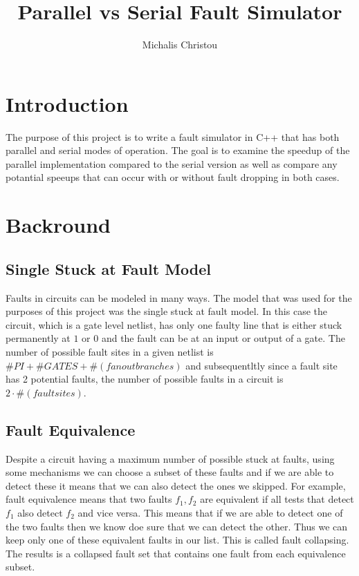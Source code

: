 \documentclass[a4paper,12pt]{article}
\author{Michalis Christou}
\title{Parallel vs Serial Fault Simulator}
\begin{document}
\maketitle

\section*{Introduction}
The purpose of this project is to write a fault simulator in C++ that has both parallel and serial modes of operation. The goal is to examine the speedup of the parallel implementation compared to the serial version as well as compare any potantial speeups that can occur with or without fault dropping in both cases.


\section*{Backround}
\subsection*{Single Stuck at Fault Model}
Faults in circuits can be modeled in many ways. The model that was used for the purposes of this project was the single stuck at fault model. In this case the circuit, which is a gate level netlist, has only one faulty line that is either stuck permanently at $1$ or $0$ and the fault can be at an input or output of a gate. The number of possible fault sites in a given netlist is $\# PI + \#GATES + \#(fanout branches)$ and subsequentltly since a fault site has 2 potential faults, the number of possible faults in a circuit is $2 \cdot \#(fault sites)$. 

\subsection*{Fault Equivalence}
Despite a circuit having a maximum number of possible stuck at faults, using some mechanisms we can choose a subset of these faults and if we are able to detect these it means that we can also detect the ones we skipped. For example, fault equivalence means that two faults $f_1, f_2$ are equivalent if all tests that detect $f_1$ also detect $f_2$ and vice versa. This means that if we are able to detect one of the two faults then we know doe sure that we can detect the other. Thus we can keep only one of these equivalent faults in our list. This is called fault collapsing. The results is a collapsed fault set that contains one fault from each equivalence subset.
\end{document}
